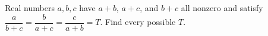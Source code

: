 Real numbers $a,b,c$ have $a+b$, $a+c$, and $b+c$ all nonzero and satisfy $\dfrac{a}{b+c}=\dfrac{b}{a+c}=\dfrac{c}{a+b}=T$. Find every possible $T$.
